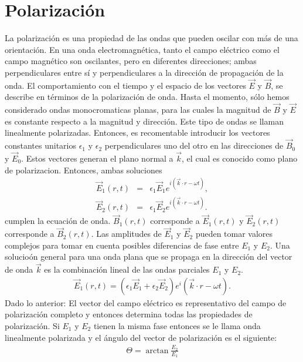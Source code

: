 \documentclass[letterpaper,12pt,oneside]{book}
\begin{document}
\section{Polarizaci\'on}
%
La polarizaci\'on  es una propiedad de las ondas que pueden oscilar con m\'as de una orientaci\'on. En una onda electromagn\'etica, tanto el campo el\'ectrico como el campo magn\'etico son oscilantes, pero en diferentes direcciones; ambas perpendiculares entre s\'i y perpendiculares a la direcci\'on de propagaci\'on de la onda. El comportamiento con el tiempo y el espacio de los vectores $\vec E$ y $\vec B$, se describe en t\'erminos de la polarizaci\'on de onda. 
%
Hasta el momento, s\'olo hemos considerado ondas monocromaticas planas, para las cuales la magnitud de $\vec B$ y $\vec E$ es constante respecto a la magnitud y direcci\'on. Este tipo de ondas se llaman linealmente polarizadas. 
%
Entonces, es recomentable introducir los vectores constantes unitarios $\epsilon_1$ y $\epsilon_2$ perpendiculares uno del otro en las direcciones de $\vec B_0$ y $\vec E_0$. Estos vectores generan el plano normal a $\vec k$, el cual es conocido como plano de polarizacion. Entonces, ambas soluciones 
%
\begin{eqnarray}
\vec E_1(r,t) &=& \epsilon_1\vec E_1 e^{i(\vec k\cdot r - \omega t)},\\
\vec E_2(r,t) &=& \epsilon_1\vec E_2 e^{i(\vec k\cdot r - \omega t)}.
\end{eqnarray}
%
cumplen la ecuaci\'on de onda. $\vec B_1(r,t)$ corresponde a $\vec E_1(r,t)$ y $\vec E_2(r,t)$ corresponde a $\vec B_2(r,t)$. Las amplitudes de $\vec E_1$ y $\vec E_2$ pueden tomar valores complejos para tomar en cuenta posibles diferencias de fase entre $E_1$ y $E_2$. Una solucio\'on general para una onda plana que se propaga en la direcci\'on del vector de onda $\vec k$ es la combinaci\'on lineal de las ondas parciales $E_1$ y $E_2$. 
\begin{eqnarray}
\vec E_1(r,t) = (\epsilon_1\vec E_1 + \epsilon_2\vec E_2) e^i(\vec k\cdot r - \omega t)\label{pol}.
\end{eqnarray}
Dado lo anterior: El vector del campo el\'ectrico es representativo del campo de polarizaci\'on completo y entonces determina todas las propiedades de polarizaci\'on.  Si $E_1$ y $E_2$ tienen la misma fase entonces se le llama onda linealmente polarizada y el \'angulo del vector de polarizaci\'on es el siguiente: 
\begin{eqnarray}
\Theta = \arctan{\frac{E_2}{E_1}}\nonumber
\end{eqnarray}
\end{document}
